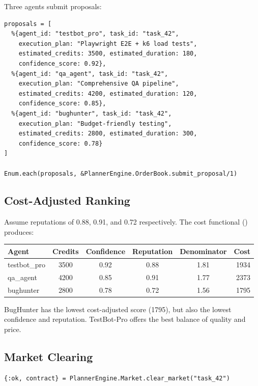 \documentclass[12pt,a4paper]{article}
\theoremstyle{plain}
\theoremstyle{definition}
\begin{document}
Three agents submit proposals:

\begin{lstlisting}[caption={Submitting proposals},label={lst:walk-proposals}]
proposals = [
  %{agent_id: "testbot_pro", task_id: "task_42",
    execution_plan: "Playwright E2E + k6 load tests",
    estimated_credits: 3500, estimated_duration: 180,
    confidence_score: 0.92},
  %{agent_id: "qa_agent", task_id: "task_42",
    execution_plan: "Comprehensive QA pipeline",
    estimated_credits: 4200, estimated_duration: 120,
    confidence_score: 0.85},
  %{agent_id: "bughunter", task_id: "task_42",
    execution_plan: "Budget-friendly testing",
    estimated_credits: 2800, estimated_duration: 300,
    confidence_score: 0.78}
]

Enum.each(proposals, &PlannerEngine.OrderBook.submit_proposal/1)
\end{lstlisting}

\subsection{Cost-Adjusted Ranking}

Assume reputations of 0.88, 0.91, and 0.72 respectively. The cost functional () produces:

\begin{center}
\begin{tabular}{lccccr}
\toprule
\textbf{Agent} & \textbf{Credits} & \textbf{Confidence} & \textbf{Reputation} & \textbf{Denominator} & \textbf{Cost} \\
\midrule
testbot\_pro & 3500 & 0.92 & 0.88 & 1.81 & 1934 \\
qa\_agent & 4200 & 0.85 & 0.91 & 1.77 & 2373 \\
bughunter & 2800 & 0.78 & 0.72 & 1.56 & 1795 \\
\bottomrule
\end{tabular}
\end{center}

BugHunter has the lowest cost-adjusted score (1795), but also the lowest confidence and reputation. TestBot-Pro offers the best balance of quality and price.

\subsection{Market Clearing}

\begin{lstlisting}[caption={Clearing the market},label={lst:walk-clear}]
{:ok, contract} = PlannerEngine.Market.clear_market("task_42")
\end{lstlisting}
\end{document}
